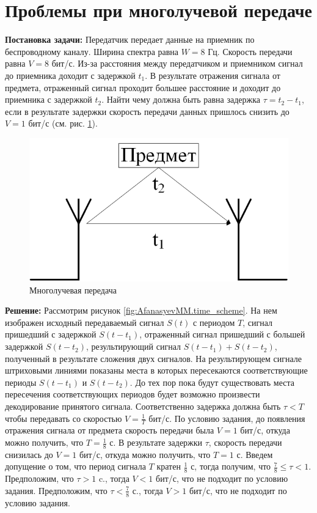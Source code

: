 \section{Проблемы при многолучевой передаче}

\textbf{Постановка задачи:}
Передатчик передает данные на приемник по беспроводному каналу.
Ширина спектра равна $W=8$ Гц.
Скорость передачи равна $V=8$ бит/с.
Из-за расстояния между передатчиком и приемником сигнал до
приемника доходит с задержкой $t_1$.
В результате отражения сигнала от предмета, отраженный сигнал
проходит большее расстояние и доходит до приемника с задержкой $t_2$.
Найти чему должна быть равна задержка $\tau=t_2-t_1$, если в результате
задержки скорость передачи данных пришлось снизить до $V=1$ бит/с
(см. рис. \ref{fig:AfanasyevMM.structure_scheme}).

\begin{figure}[hp]
	\centering
	\includegraphics[width=0.6\linewidth]{AfanasyevMM/img/structure_scheme}
	\caption{Многолучевая передача}
	\label{fig:AfanasyevMM.structure_scheme}
\end{figure}

\textbf{Решение:}
Рассмотрим рисунок \ref{fig:AfanasyevMM.time_scheme}.
На нем изображен исходный передаваемый сигнал $S(t)$ с периодом $T$,
сигнал пришедший с задержкой $S(t-t_1)$,
отраженный сигнал пришедший с большей задержкой $S(t-t_2)$,
результирующий сигнал $S(t-t_1)+S(t-t_2)$, полученный в результате
сложения двух сигналов.
На результирующем сигнале штриховыми линиями показаны места
в которых пересекаются соответствующие периоды $S(t-t_1)$ и $S(t-t_2)$.
До тех пор пока будут существовать места пересечения соответствующих
периодов будет возможно произвести декодирование принятого сигнала.
Соответственно задержка должна быть $\tau < T$ чтобы передавать
со скоростью $V= \frac{1}{T}$ бит/с.
По условию задания, до появления отражения сигнала от предмета
скорость передачи была $V=1$ бит/с, откуда можно получить, что
$T= \frac{1}{8}$ с.
В результате задержки $\tau$, скорость передачи
снизилась до $V=1$ бит/с, откуда можно получить, что $T=1$ с.
Введем допущение о том, что период сигнала $T$ кратен $\frac{1}{8}$ с,
тогда получим, что $\frac{7}{8} \leq \tau < 1$.
Предположим, что $\tau > 1$ c., тогда $V<1$ бит/с, что не подходит
по условию задания.
Предположим, что $\tau < \frac{7}{8}$ с., тогда $V>1$ бит/с, что
не подходит по условию задания.


